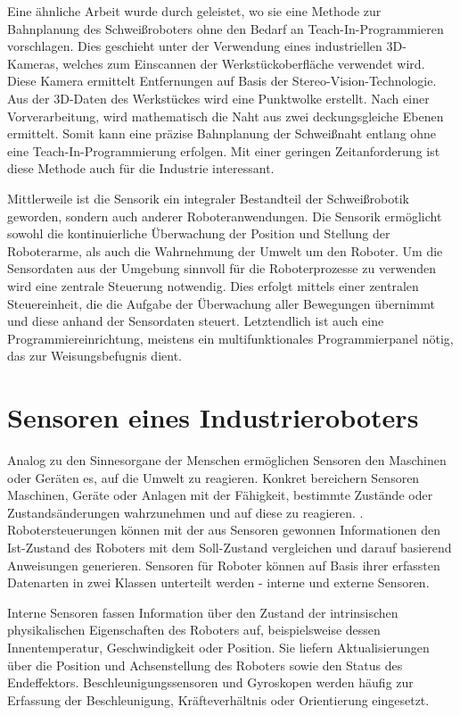 Eine ähnliche Arbeit wurde durch \textcite{Geng2021} geleistet, wo sie eine Methode zur Bahnplanung des Schweißroboters ohne den Bedarf an Teach-In-Programmieren vorschlagen. Dies geschieht unter der Verwendung eines industriellen 3D-Kameras, welches zum Einscannen der Werkstückoberfläche verwendet wird. Diese Kamera ermittelt Entfernungen auf Basis der Stereo-Vision-Technologie. Aus der 3D-Daten des Werkstückes wird eine Punktwolke erstellt. Nach einer Vorverarbeitung, wird mathematisch die Naht aus zwei deckungsgleiche Ebenen ermittelt. Somit kann eine präzise Bahnplanung der Schweißnaht entlang ohne eine Teach-In-Programmierung erfolgen. Mit einer geringen Zeitanforderung ist diese Methode auch für die Industrie interessant. 

Mittlerweile ist die Sensorik ein integraler Bestandteil der Schweißrobotik geworden, sondern auch anderer Roboteranwendungen. Die Sensorik ermöglicht sowohl die kontinuierliche Überwachung der Position und Stellung der Roboterarme, als auch die Wahrnehmung der Umwelt um den Roboter. Um die Sensordaten aus der Umgebung sinnvoll für die Roboterprozesse zu verwenden wird eine zentrale Steuerung notwendig. Dies erfolgt mittels einer zentralen Steuereinheit, die die Aufgabe der Überwachung aller Bewegungen übernimmt und diese anhand der Sensordaten steuert. Letztendlich ist auch eine Programmiereinrichtung, meistens ein multifunktionales Programmierpanel nötig, das zur Weisungsbefugnis dient. \autocite[114]{maier2022grundlagen}

\section{Sensoren eines Industrieroboters}
Analog zu den Sinnesorgane der Menschen ermöglichen Sensoren den Maschinen oder Geräten es, auf die Umwelt zu reagieren. Konkret bereichern Sensoren Maschinen, Geräte oder Anlagen mit der Fähigkeit, bestimmte Zustände oder Zustandsänderungen wahrzunehmen und auf diese zu reagieren. \autocite[1-2]{HesseStefan2018SFDP}. Robotersteuerungen können mit der aus Sensoren gewonnen Informationen den Ist-Zustand des Roboters mit dem Soll-Zustand vergleichen und darauf basierend Anweisungen generieren. Sensoren für Roboter können auf Basis ihrer erfassten Datenarten in zwei Klassen unterteilt werden - interne und externe Sensoren. \autocite{maier2022grundlagen}

Interne Sensoren fassen Information über den Zustand der intrinsischen physikalischen Eigenschaften des Roboters auf, beispielsweise dessen Innentemperatur, Geschwindigkeit oder Position. Sie liefern Aktualisierungen über die Position und Achsenstellung des Roboters sowie den Status des Endeffektors. Beschleunigungssensoren und Gyroskopen werden häufig zur Erfassung der Beschleunigung, Kräfteverhältnis oder Orientierung eingesetzt. \autocite[220]{maier2022grundlagen}

